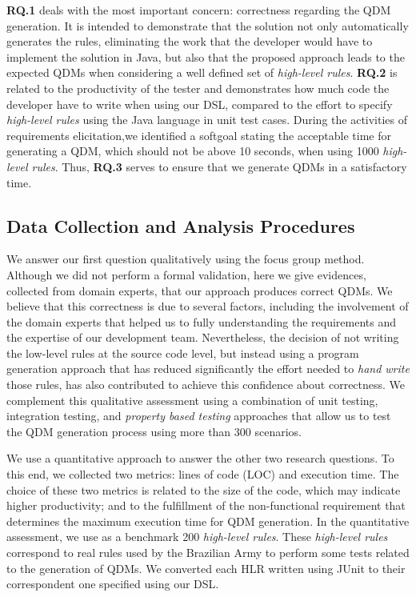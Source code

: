 \documentclass[AMA,STIX1COL,hidelinks]{WileyNJD-v2}
\newcommand{\callers}{\emph{high-level rules}\xspace}
\newcommand{\shc}{HLR\xspace}
\begin{document}
\textbf{RQ.1} deals with the most important concern: correctness regarding the QDM generation. It is intended to demonstrate that the solution not only automatically generates the rules, eliminating the work that the developer would have to implement the solution in Java, but also that the proposed approach leads to the expected QDMs when considering a well defined set of \callers. \textbf{RQ.2} is related to the productivity of the tester and demonstrates how much code the developer have to write when using our DSL, compared to the effort to specify \callers using the Java language in unit test cases. During the activities of requirements elicitation,we identified a softgoal stating the  acceptable time for generating a QDM, which should not be above 10 seconds, when using 1000 \callers. Thus, \textbf{RQ.3} serves to ensure that we generate QDMs in a satisfactory time.



\subsection{Data Collection and Analysis Procedures}

We answer our first question qualitatively using the focus group method. Although
we did not perform a formal validation, here we give evidences, collected from domain experts, that our approach produces correct QDMs. We believe that this correctness is due to several factors, including the involvement of the domain experts that helped us to fully understanding the requirements and the expertise of our development team. Nevertheless, the decision of not writing the low-level rules at the source code level, but instead using a program generation approach that has reduced significantly the effort needed to \emph{hand write} those rules, has also contributed to achieve this confidence about correctness. We complement this qualitative
assessment using a combination of unit testing, integration testing, and
\emph{property based testing} approaches that allow us to
test the QDM generation process using more than 300 scenarios. 

We use a quantitative approach to answer the other two research questions.
To this end, we collected two metrics: lines of code (LOC) and execution time. The choice of these two metrics is related to the size of the code, which may indicate higher productivity; and to the fulfillment of the non-functional requirement that determines the maximum execution time for QDM generation. In the quantitative assessment, we use as a benchmark 200 \callers. These \callers correspond to real rules used by the Brazilian Army to perform some tests related to the generation of QDMs. We converted each \shc written using JUnit to their correspondent one specified using our DSL.
\end{document}
